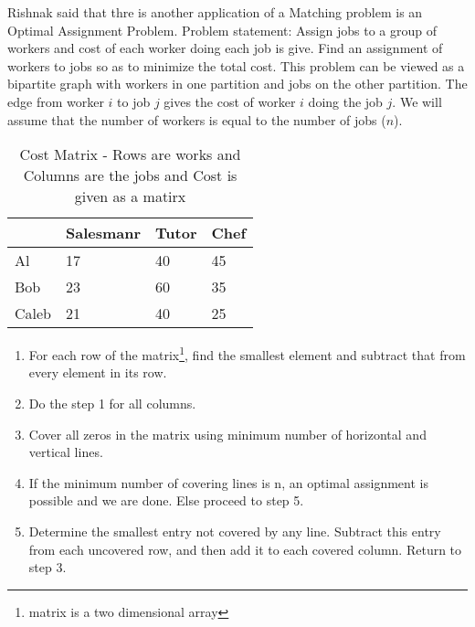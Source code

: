 Rishnak said that thre is another application of a Matching problem is an Optimal Assignment Problem. 
Problem statement: Assign jobs to a group of workers and cost of each worker doing each job is give. Find an assignment of workers to jobs so as to minimize the total cost. This problem can be viewed as a bipartite graph with workers in one partition and jobs on the other partition. The edge from worker $i$ to job $j$ gives the cost of worker $i$ doing the job $j$.
We will assume that the number of workers is equal to the number of jobs ($n$).
\begin{table}
\begin{center}
\begin{tabular}{ ||p{2cm}||p{2cm}||p{1.5cm} ||p{1.5cm}|| }
 \hline
 
  & Salesmanr&Tutor&Chef\\
 \hline
 Al  & 17   &40&45\\
 Bob& 23&60&35\\
 Caleb&21&40&25\\

 
 \hline
\end{tabular}
\caption{Cost Matrix - Rows are works and Columns are the jobs and Cost is given as a matirx }\label{16t3}
\end{center}
\end{table}

\begin{enumerate}
\item For each row of the matrix\footnote{matrix is a two dimensional array}, find the smallest element and subtract that from every element in its row.
\item Do the step 1 for all columns.
\item Cover all zeros in the matrix using minimum number of horizontal  and vertical lines.
\item If the minimum number of covering lines is n, an optimal assignment is possible and we are done. Else  proceed to step 5.
\item Determine the smallest entry not covered by any line. Subtract this entry from each uncovered row, and then add it to each covered column. Return to step 3.
\end{enumerate}

